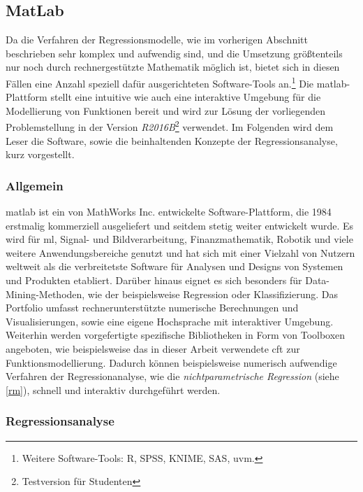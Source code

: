 \subsection{MatLab}
\label{matlab}

Da die Verfahren der Regressionsmodelle, wie im vorherigen Abschnitt beschrieben sehr komplex und aufwendig sind, und die Umsetzung größtenteils nur noch durch rechnergestützte Mathematik möglich ist, bietet sich in diesen Fällen eine Anzahl speziell dafür ausgerichteten Software-Tools an.\footnote{Weitere Software-Tools: R, SPSS, KNIME, SAS, uvm.} Die \gls{matlab}-Plattform stellt eine intuitive wie auch eine interaktive Umgebung für die Modellierung von Funktionen bereit und wird zur Lösung der vorliegenden Problemstellung in der Version \textit{R2016B}\footnote{Testversion für Studenten} verwendet. Im Folgenden wird dem Leser die Software, sowie die beinhaltenden Konzepte der Regressionsanalyse, kurz vorgestellt.

\subsubsection{Allgemein}
\gls{matlab} ist ein von MathWorks Inc. entwickelte Software-Plattform, die 1984 erstmalig kommerziell ausgeliefert und seitdem stetig weiter entwickelt wurde. Es wird für \gls{ml}, Signal- und Bildverarbeitung, Finanzmathematik, Robotik und viele weitere Anwendungsbereiche genutzt und hat sich mit einer Vielzahl von Nutzern weltweit als die verbreitetste Software für Analysen und Designs von Systemen und Produkten etabliert. Darüber hinaus eignet es sich besonders für Data-Mining-Methoden, wie der beispielsweise Regression oder Klassifizierung. Das Portfolio umfasst rechnerunterstützte numerische Berechnungen und Visualisierungen, sowie eine eigene Hochsprache mit interaktiver Umgebung. Weiterhin werden vorgefertigte spezifische Bibliotheken in Form von Toolboxen angeboten, wie beispielsweise das in dieser Arbeit verwendete \gls{cft} zur Funktionsmodellierung. Dadurch können beispielsweise numerisch aufwendige Verfahren der Regressionanalyse, wie die \textit{nichtparametrische Regression} (siehe \vref{rm}), schnell und interaktiv durchgeführt werden. 

\subsubsection{Regressionsanalyse}

